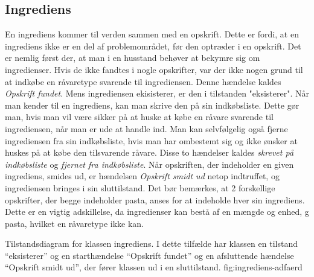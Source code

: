 \subsection{Ingrediens}

En ingrediens kommer til verden sammen med en opskrift. Dette er fordi, at en ingrediens ikke er en del af problemområdet, før den optræder i en opskrift. Det er nemlig først der, at man i en husstand behøver at bekymre sig om ingredienser. Hvis de ikke fandtes i nogle opskrifter, var der ikke nogen grund til at indkøbe en råvaretype svarende til ingrediensen. Denne hændelse kaldes \textit{Opskrift fundet}. Mens ingrediensen ekisisterer, er den i tilstanden "eksisterer". Når man kender til en ingrediens, kan man skrive den på sin indkøbsliste. Dette gør man, hvis man vil være sikker på at huske at købe en råvare svarende til ingrediensen, når man er ude at handle ind. Man kan selvfølgelig også fjerne ingrediensen fra sin indkøbsliste, hvis man har ombestemt sig og ikke ønsker at huskes på at købe den tilsvarende råvare. Disse to hændelser kaldes \textit{skrevet på indkøbsliste} og \textit{fjernet fra indkøbsliste}. Når opskriften, der indeholder en given ingrediens, smides ud, er hændelsen \textit{Opskrift smidt ud} netop indtruffet, og ingrediensen bringes i sin sluttilstand. Det bør bemærkes, at 2 forskellige opskrifter, der begge indeholder pasta, anses for at indeholde hver sin ingrediens. Dette er en vigtig adskillelse, da ingredienser kan bestå af en mængde og enhed,  g pasta, hvilket en råvaretype ikke kan.

  {Tilstandsdiagram for klassen ingrediens. I dette tilfælde har klassen en tilstand ``eksisterer'' og en starthændelse ``Opskrift fundet'' og en afsluttende hændelse ``Opskrift smidt ud'', der fører klassen ud i en sluttilstand.}
  {fig:ingrediens-adfaerd}
